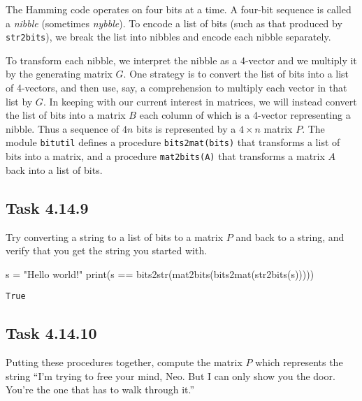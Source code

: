 \documentclass[
  letterpaper,
  DIV=11,
  numbers=noendperiod]{scrartcl}
\newenvironment{Shaded}{\begin{snugshade}}{\end{snugshade}}
\newcommand{\BuiltInTok}[1]{\textcolor[rgb]{0.00,0.23,0.31}{#1}}
\newcommand{\NormalTok}[1]{\textcolor[rgb]{0.00,0.23,0.31}{#1}}
\newcommand{\OperatorTok}[1]{\textcolor[rgb]{0.37,0.37,0.37}{#1}}
\newcommand{\StringTok}[1]{\textcolor[rgb]{0.13,0.47,0.30}{#1}}
\begin{document}
The Hamming code operates on four bits at a time. A four-bit sequence is
called a \emph{nibble} (sometimes \emph{nybble}). To encode a list of
bits (such as that produced by \texttt{str2bits}), we break the list
into nibbles and encode each nibble separately.

To transform each nibble, we interpret the nibble as a 4-vector and we
multiply it by the generating matrix \(G\). One strategy is to convert
the list of bits into a list of 4-vectors, and then use, say, a
comprehension to multiply each vector in that list by \(G\). In keeping
with our current interest in matrices, we will instead convert the list
of bits into a matrix \(B\) each column of which is a 4-vector
representing a nibble. Thus a sequence of \(4n\) bits is represented by
a \(4 \times n\) matrix \(P\). The module \texttt{bitutil} defines a
procedure \texttt{bits2mat(bits)} that transforms a list of bits into a
matrix, and a procedure \texttt{mat2bits(A)} that transforms a matrix
\(A\) back into a list of bits.

\hypertarget{task-4.14.9}{%
\subsection{Task 4.14.9}\label{task-4.14.9}}

Try converting a string to a list of bits to a matrix \(P\) and back to
a string, and verify that you get the string you started with.

\begin{Shaded}
\begin{Highlighting}[numbers=left,,]
\NormalTok{s }\OperatorTok{=} \StringTok{"Hello world!"}
\BuiltInTok{print}\NormalTok{(s }\OperatorTok{==}\NormalTok{ bits2str(mat2bits(bits2mat(str2bits(s)))))}
\end{Highlighting}
\end{Shaded}

\begin{lstlisting}
True
\end{lstlisting}

\hypertarget{task-4.14.10}{%
\subsection{Task 4.14.10}\label{task-4.14.10}}

Putting these procedures together, compute the matrix \(P\) which
represents the string ``I'm trying to free your mind, Neo. But I can
only show you the door. You're the one that has to walk through it.''
\end{document}
